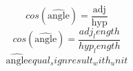 \[cos(\widehat{{\text{{{angle}}}}})=\frac{{\text{{{adj}}}}}{{\text{{{hyp}}}}}\]
\[cos(\widehat{{\text{{{angle}}}}})=\frac{{{adj_length}}}{{{hyp_length}}}\]
\[\widehat{{\text{{{angle}}}}}{equal_sign}{result_with_unit}\]
